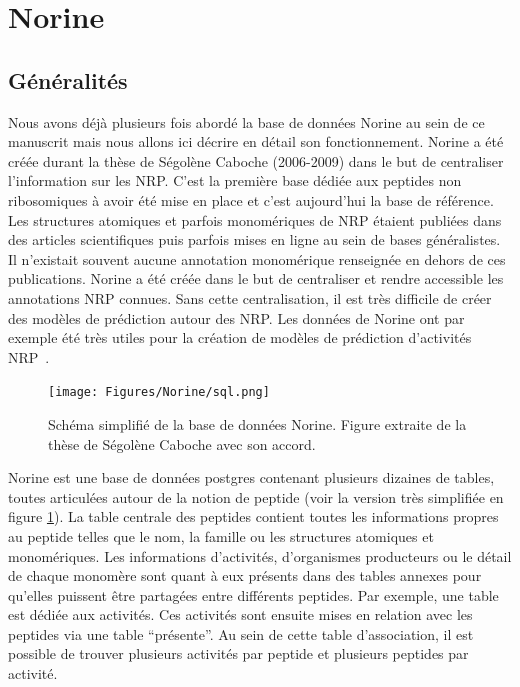 \section{Norine}
\label{nor_3}

\subsection{Généralités}

Nous avons déjà plusieurs fois abordé la base de données Norine au sein de ce manuscrit mais nous allons ici décrire en détail son fonctionnement.
Norine a été créée durant la thèse de Ségolène Caboche (2006-2009) dans le but de centraliser l'information sur les NRP.
C'est la première base dédiée aux peptides non ribosomiques à avoir été mise en place et c'est aujourd'hui la base de référence.
Les structures atomiques et parfois monomériques de NRP étaient publiées dans des articles scientifiques puis parfois mises en ligne au sein de bases généralistes.
Il n'existait souvent aucune annotation monomérique renseignée en dehors de ces publications.
Norine a été créée dans le but de centraliser et rendre accessible les annotations NRP connues.
Sans cette centralisation, il est très difficile de créer des modèles de prédiction autour des NRP.
Les données de Norine ont par exemple été très utiles pour la création de modèles de prédiction d'activités NRP~\cite{abdo_prediction_2014,abdo_new_2012}.

\begin{figure}[h!]
  \begin{center}
    \texttt{[image: Figures/Norine/sql.png]}
    \caption{\label{sql}Schéma simplifié de la base de données Norine.
    Figure extraite de la thèse de Ségolène Caboche avec son accord.}
  \end{center}
\end{figure}

Norine est une base de données postgres contenant plusieurs dizaines de tables, toutes articulées autour de la notion de peptide (voir la version très simplifiée en figure \ref{sql}).
La table centrale des peptides contient toutes les informations propres au peptide telles que le nom, la famille ou les structures atomiques et monomériques.
Les informations d'activités, d'organismes producteurs ou le détail de chaque monomère sont quant à eux présents dans des tables annexes pour qu'elles puissent être partagées entre différents peptides.
Par exemple, une table est dédiée aux activités.
Ces activités sont ensuite mises en relation avec les peptides via une table ``présente''.
Au sein de cette table d'association, il est possible de trouver plusieurs activités par peptide et plusieurs peptides par activité.

